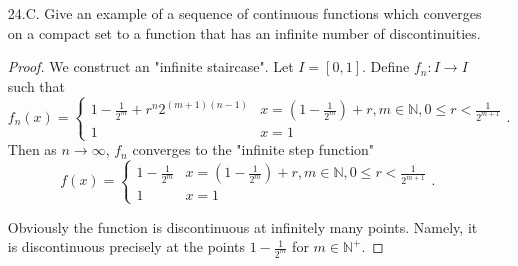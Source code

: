 \begin{itemize}
\begin{proof}
	$f(z_n) \to f(x_0)$ is trivial as it follows from definition of $f$ in $D_1 \setminus D$. Now we verify $f(y_n) \to f(x_0)$. 
	For each $n\ge 1$, there exists a sequence $(a_m^{(n)})_{m \in \mathbb{N}}$ contained in $D$ converging to $y_n$. Also, let $a_m^{(0)} \to x_0$ in $D$. Take $\varepsilon>0$ and we have $\delta>0$ as in definition for uniform continuity of $f$ in $D$. Then there exists  $N_\delta$ such that $|y_n - x_0|<\delta$ for $n > N_\delta$. Now fix $n > N_\delta$. We let $\delta'>0$ be such that $\delta' < \delta - |y_n - x_0|$. Then there exists $M_{\delta'}^{(n)}$ and $M_{\delta'}^{(0)}$ such that $|a_m^{(n)} - y_n| < \delta'$ for $m > M_{\delta'}^{(n)}$ and $|a_m^{(0)} - x_0| < \delta'$ for $m > M_{\delta'}^{(0)}$. Using triangle inequality, we verify that $|a_m^{(n)} - a_{m}^{(0)}| < \delta$ for all $m > M$ for some $M$. But by uniform continuity of $f$ in $D$, we know that $\left| f(a_m^{(n)}) - f(a_m^{(0)}) \right| < \varepsilon $ for $m > M$. Hence 
	 \[
		|f(y_n) - f(x_0)| 
		= \left| \lim_{m \to \infty} f(a_m^{(n)}) - \lim_{m \to \infty} f(a_m^{(0)}) \right| 
		= \left| \lim_{m \to \infty} f(a_m^{(n)}) - f(a_m^{(0)}) \right|  \le \varepsilon
	.\] 

	Hence for each $\varepsilon>0$, there exists $N_\delta$, such that $|f(y_n) - f(x_0)| < \varepsilon$ whenever $n > N_\delta$. Hence $f(y_n) \to f(x_0)$.
\end{proof}
\item 
	[24.C.] Give an example of a sequence of continuous functions which converges on a compact set to a function that has an infinite number of discontinuities.
\begin{proof}
	We construct an "infinite staircase". Let $I = [0,1]$. Define $f_n: I \to I$ such that
	\[
		f_n(x) = \begin{cases}
			1-\frac{1}{2^m} + r^n 2^{(m+1)(n-1)} & x = (1-\frac{1}{2^m})+ r, m \in \mathbb{N}, 0\le r < \frac{1}{2^{m+1}}\\
			1 & x = 1
		\end{cases}
	.\] 
	Then as $n\to \infty $, $f_n$ converges to the "infinite step function"
	\[
		f(x) = \begin{cases}
			1-\frac{1}{2^m} & x = (1-\frac{1}{2^m})+ r, m \in \mathbb{N}, 0\le r < \frac{1}{2^{m+1}}\\
			1 & x = 1
		\end{cases}
	.\] 

	Obviously the function is discontinuous at infinitely many points. Namely, it is discontinuous precisely at the points $1-\frac{1}{2^m}$ for $m \in \mathbb{N}^+$.


\end{proof}
\end{itemize}

